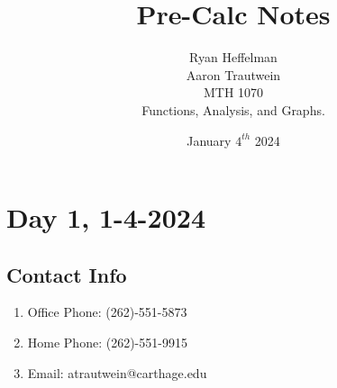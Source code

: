\documentclass[12pt]{article}
\begin{document}
\date{January \(4^{th}\) 2024}
\title{Pre-Calc Notes}
\author{Ryan Heffelman\\Aaron Trautwein \\
MTH 1070 \\Functions, Analysis, and Graphs.} 
\maketitle

\section{Day 1, 1-4-2024}
\subsection{Contact Info}
\begin{enumerate}

    \item Office Phone: (262)-551-5873
    
    \item Home Phone: (262)-551-9915
    
    \item Email: atrautwein@carthage.edu
    
\end{enumerate}
\end{document}
